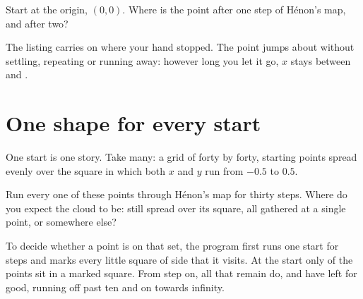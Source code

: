 \begin{think}
Start at the origin, $(0, 0)$. Where is the point after one step of Hénon's
map, and after two?
\end{think}



\noindent
The listing carries on where your hand stopped. The point jumps about without
settling, repeating or running away: however long you let it go, $x$ stays
between  and .

\section{One shape for every start}
\label{sec:ch10-cloud}

\noindent
One start is one story. Take many: a grid of forty by forty,
 starting points spread evenly over the square in which
both $x$ and $y$ run from $-\num{0.5}$ to $\num{0.5}$.

\begin{think}
Run every one of these points through Hénon's map for thirty steps. Where do
you expect the cloud to be: still spread over its square, all gathered at a
single point, or somewhere else?
\end{think}



\noindent
To decide whether a point is on that set, the program first runs one start
for  steps and marks every little square of side
 that it visits. At the start only 
of the  points sit in a marked square. From step
 on, all  that remain do, and
 have left for good, running off past ten and on
towards infinity.

